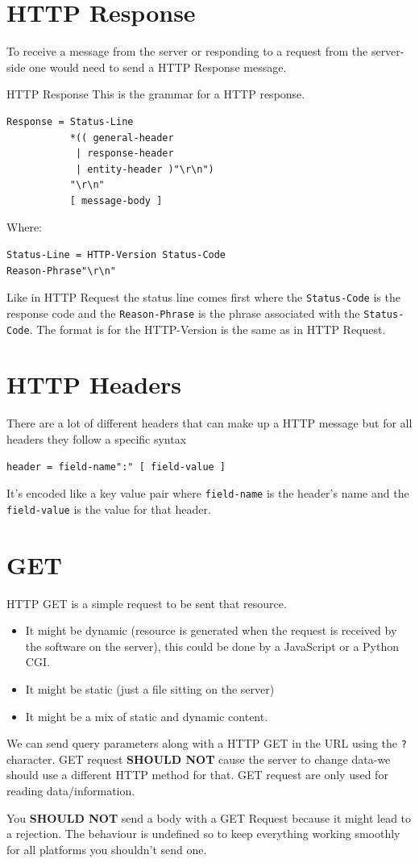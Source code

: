 \documentclass[../CMPUT-404-Notes.tex]{subfiles}
\begin{document}
\section{HTTP Response}
To receive a message from the server or responding to a request from the server-side one would need to send a HTTP Response message.
\begin{Definition}
{HTTP Response}
This is the grammar for a HTTP response.
\begin{verbatim}
Response = Status-Line
           *(( general-header
            | response-header 
            | entity-header )"\r\n")
           "\r\n"
           [ message-body ]
\end{verbatim}
Where:
\begin{verbatim}
Status-Line = HTTP-Version Status-Code 
Reason-Phrase"\r\n"
\end{verbatim}
Like in HTTP Request the status line comes first where the \texttt{Status-Code} is the response code and the \texttt{Reason-Phrase} is the phrase associated with the \texttt{Status-Code}.
The format is for the HTTP-Version is the same as in HTTP Request.
\end{Definition}

\section{HTTP Headers}
There are a lot of different headers that can make up a HTTP message but for all headers they follow a specific syntax
\begin{verbatim}
header = field-name":" [ field-value ]
\end{verbatim}
It's encoded like a key value pair where \texttt{field-name} is the header's name and the \texttt{field-value} is the value for that header. 

\section{GET}
HTTP GET is a simple request to be sent that resource.
\begin{itemize}
  \item It might be dynamic (resource is generated when the request is received by the software on the server), this could be done by a JavaScript or a Python CGI.
  \item It might be static (just a file sitting on the server)
  \item It might be a mix of static and dynamic content.
\end{itemize}
We can send query parameters along with a HTTP GET in the URL using the \texttt{?} character.
GET request \textbf{SHOULD NOT} cause the server to change data-we should use a different HTTP method for that. 
GET request are only used for reading data/information.
\begin{Note}
  You \textbf{SHOULD NOT} send a body with a GET Request because it might lead to a rejection. The behaviour is undefined so to keep everything working smoothly for all platforms you shouldn't send one.
\end{Note}
\end{document}

